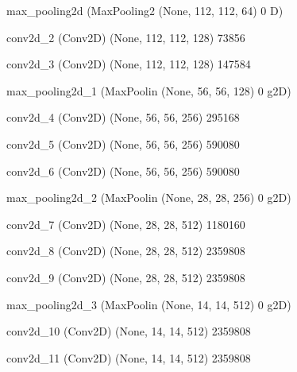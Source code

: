 \documentclass[11pt, a4paper]{article} %
\begin{document}
 max_pooling2d (MaxPooling2  (None, 112, 112, 64)      0         
 D)                                                              
                                                                 
 conv2d_2 (Conv2D)           (None, 112, 112, 128)     73856     
                                                                 
 conv2d_3 (Conv2D)           (None, 112, 112, 128)     147584    
                                                                 
 max_pooling2d_1 (MaxPoolin  (None, 56, 56, 128)       0         
 g2D)                                                            
                                                                 
 conv2d_4 (Conv2D)           (None, 56, 56, 256)       295168    
                                                                 
 conv2d_5 (Conv2D)           (None, 56, 56, 256)       590080    
                                                                 
 conv2d_6 (Conv2D)           (None, 56, 56, 256)       590080    
                                                                 
 max_pooling2d_2 (MaxPoolin  (None, 28, 28, 256)       0         
 g2D)                                                            
                                                                 
 conv2d_7 (Conv2D)           (None, 28, 28, 512)       1180160   
                                                                 
 conv2d_8 (Conv2D)           (None, 28, 28, 512)       2359808   
                                                                 
 conv2d_9 (Conv2D)           (None, 28, 28, 512)       2359808   
                                                                 
 max_pooling2d_3 (MaxPoolin  (None, 14, 14, 512)       0         
 g2D)                                                            
                                                                 
 conv2d_10 (Conv2D)          (None, 14, 14, 512)       2359808   
                                                                 
 conv2d_11 (Conv2D)          (None, 14, 14, 512)       2359808   
                                                                 
\end{document}
